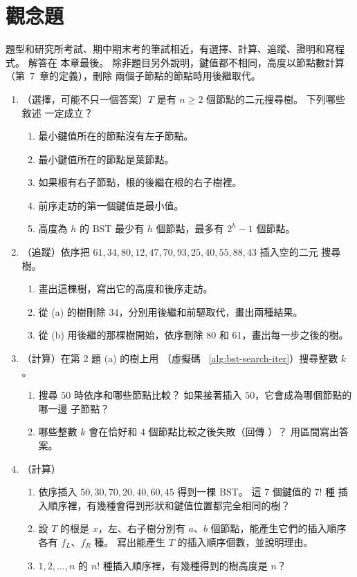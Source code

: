 \section{觀念題}
\label{sec:bst-exercises}

題型和研究所考試、期中期末考的筆試相近，有選擇、計算、追蹤、證明和寫程式。 解答在
本章最後。 除非題目另外說明，鍵值都不相同，高度以節點數計算（第~7~章的定義），刪除
兩個子節點的節點時用後繼取代。

\begin{enumerate}
\item （選擇，可能不只一個答案）$T$ 是有 $n \ge 2$ 個節點的二元搜尋樹。 下列哪些敘述
一定成立？
\begin{enumerate}
\item 最小鍵值所在的節點沒有左子節點。
\item 最小鍵值所在的節點是葉節點。
\item 如果根有右子節點，根的後繼在根的右子樹裡。
\item 前序走訪的第一個鍵值是最小值。
\item 高度為 $h$ 的 BST 最少有 $h$ 個節點，最多有 $2^h - 1$ 個節點。
\end{enumerate}

\item （追蹤）依序把 $61,\allowbreak 34,\allowbreak 80,\allowbreak 12,\allowbreak 47,\allowbreak 70,\allowbreak 93,\allowbreak 25,\allowbreak 40,\allowbreak 55,\allowbreak 88,\allowbreak 43$ 插入空的二元
搜尋樹。
\begin{enumerate}
\item 畫出這棵樹，寫出它的高度和後序走訪。
\item 從 (a) 的樹刪除 $34$，分別用後繼和前驅取代，畫出兩種結果。
\item 從 (b) 用後繼的那棵樹開始，依序刪除 $80$ 和 $61$，畫出每一步之後的樹。
\end{enumerate}

\item （計算）在第 2 題 (a) 的樹上用 （虛擬碼
~\ref{alg:bst-search-iter}）搜尋整數 $k$。
\begin{enumerate}
\item 搜尋 $50$ 時依序和哪些節點比較？ 如果接著插入 $50$，它會成為哪個節點的哪一邊
子節點？
\item 哪些整數 $k$ 會在恰好和 $4$ 個節點比較之後失敗（回傳 \NIL）？ 用區間寫出答案。
\end{enumerate}

\item （計算）
\begin{enumerate}
\item 依序插入 $50,\allowbreak 30,\allowbreak 70,\allowbreak 20,\allowbreak 40,\allowbreak 60,\allowbreak 45$ 得到一棵 BST。 這 $7$ 個鍵值的 $7!$ 種
插入順序裡，有幾種會得到形狀和鍵值位置都完全相同的樹？
\item 設 $T$ 的根是 $x$，左、右子樹分別有 $a$、$b$ 個節點，能產生它們的插入順序各有
$f_L$、$f_R$ 種。 寫出能產生 $T$ 的插入順序個數，並說明理由。
\item $1, 2, \ldots, n$ 的 $n!$ 種插入順序裡，有幾種得到的樹高度是 $n$？
\end{enumerate}


\end{enumerate}
